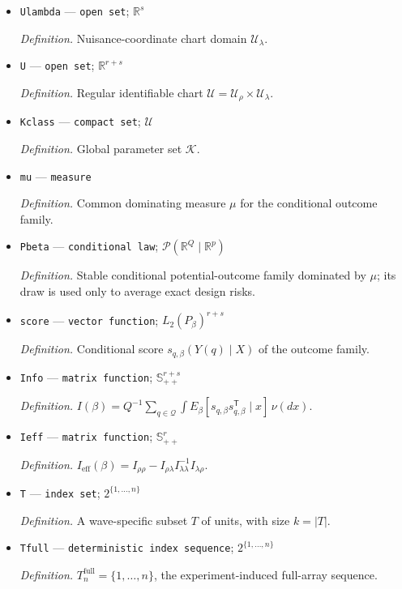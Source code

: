\documentclass{article}
\begin{document}
\begin{itemize}
  \item \texttt{Ulambda} --- \texttt{open set}; \(\mathbb R^{s}\)
  \par\smallskip\noindent\emph{Definition.} Nuisance-coordinate chart domain \(\mathcal U_{\lambda}\).
  \item \texttt{U} --- \texttt{open set}; \(\mathbb R^{r+s}\)
  \par\smallskip\noindent\emph{Definition.} Regular identifiable chart \(\mathcal U=\mathcal U_{\rho}\times\mathcal U_{\lambda}\).
  \item \texttt{Kclass} --- \texttt{compact set}; \(\mathcal U\)
  \par\smallskip\noindent\emph{Definition.} Global parameter set \(\mathcal K\).
  \item \texttt{mu} --- \texttt{measure}
  \par\smallskip\noindent\emph{Definition.} Common dominating measure \(\mu\) for the conditional outcome family.
  \item \texttt{Pbeta} --- \texttt{conditional law}; \(\mathcal P(\mathbb R^{Q}\mid\mathbb R^{p})\)
  \par\smallskip\noindent\emph{Definition.} Stable conditional potential-outcome family dominated by \(\mu\); its draw is used only to average exact design risks.
  \item \texttt{score} --- \texttt{vector function}; \(L_2(P_{\beta})^{r+s}\)
  \par\smallskip\noindent\emph{Definition.} Conditional score \(s_{q,\beta}(Y(q)\mid X)\) of the outcome family.
  \item \texttt{Info} --- \texttt{matrix function}; \(\mathbb S_{++}^{r+s}\)
  \par\smallskip\noindent\emph{Definition.} \(I(\beta)=Q^{-1}\sum_{q\in\mathcal Q}\int E_{\beta}[s_{q,\beta}s_{q,\beta}^{\mathsf T}\mid x]\,\nu(dx)\).
  \item \texttt{Ieff} --- \texttt{matrix function}; \(\mathbb S_{++}^{r}\)
  \par\smallskip\noindent\emph{Definition.} \(I_{\mathrm{eff}}(\beta)=I_{\rho\rho}-I_{\rho\lambda}I_{\lambda\lambda}^{-1}I_{\lambda\rho}\).
  \item \texttt{T} --- \texttt{index set}; \(2^{\{1,\ldots,n\}}\)
  \par\smallskip\noindent\emph{Definition.} A wave-specific subset \(T\) of units, with size \(k=|T|\).
  \item \texttt{Tfull} --- \texttt{deterministic index sequence}; \(2^{\{1,\ldots,n\}}\)
  \par\smallskip\noindent\emph{Definition.} \(T_n^{\mathrm{full}}=\{1,\ldots,n\}\), the experiment-induced full-array sequence.

\end{itemize}
\end{document}
